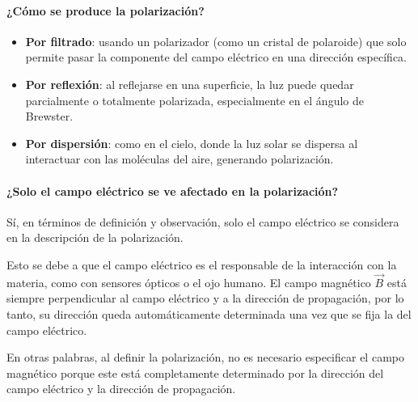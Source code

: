 \paragraph{¿Cómo se produce la polarización?}
\begin{itemize}
  \item \textbf{Por filtrado}: usando un polarizador (como un cristal de polaroide) que solo permite pasar la componente del campo eléctrico en una dirección específica.
  \item \textbf{Por reflexión}: al reflejarse en una superficie, la luz puede quedar parcialmente o totalmente polarizada, especialmente en el ángulo de Brewster.
  \item \textbf{Por dispersión}: como en el cielo, donde la luz solar se dispersa al interactuar con las moléculas del aire, generando polarización.
\end{itemize}

\paragraph{¿Solo el campo eléctrico se ve afectado en la polarización?}

Sí, en términos de definición y observación, solo el campo eléctrico se considera en la descripción de la polarización.

Esto se debe a que el campo eléctrico es el responsable de la interacción con la materia, como con sensores ópticos o el ojo humano. El campo magnético \(\vec{B}\) está siempre perpendicular al campo eléctrico y a la dirección de propagación, por lo tanto, su dirección queda automáticamente determinada una vez que se fija la del campo eléctrico.

En otras palabras, al definir la polarización, no es necesario especificar el campo magnético porque este está completamente determinado por la dirección del campo eléctrico y la dirección de propagación.